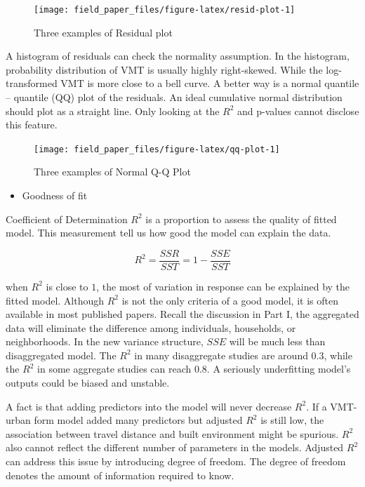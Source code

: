 \documentclass[
  11pt,
  openany]{memoir}
\providecommand{\tightlist}{%
  \setlength{\itemsep}{0pt}\setlength{\parskip}{0pt}}
\begin{document}
\begin{figure}

{\centering \texttt{[image: field\_paper\_files/figure-latex/resid-plot-1]} 

}

\caption{Three examples of Residual plot}\label{fig:resid-plot}
\end{figure}

A histogram of residuals can check the normality assumption. In the histogram, probability distribution of VMT is usually highly right-skewed. While the log-transformed VMT is more close to a bell curve.
A better way is a normal quantile -- quantile (QQ) plot of the residuals.
An ideal cumulative normal distribution should plot as a straight line.
Only looking at the \(R^2\) and p-values cannot disclose this feature.

\begin{figure}

{\centering \texttt{[image: field\_paper\_files/figure-latex/qq-plot-1]} 

}

\caption{Three examples of Normal Q-Q Plot}\label{fig:qq-plot}
\end{figure}

\begin{itemize}
\tightlist
\item
  Goodness of fit
\end{itemize}

Coefficient of Determination \(R^2\) is a proportion to assess the quality of fitted model. This measurement tell us how good the model can explain the data.

\begin{equation}
R^2 =\frac{SSR}{SST}=1-\frac{SSE}{SST}
\label{eq:rsq}
\end{equation}

when \(R^2\) is close to \(1\), the most of variation in response can be explained by the fitted model. Although \(R^2\) is not the only criteria of a good model, it is often available in most published papers. Recall the discussion in Part I, the aggregated data will eliminate the difference among individuals, households, or neighborhoods. In the new variance structure, \(SSE\) will be much less than disaggregated model. The \(R^2\) in many disaggregate studies are around 0.3, while the \(R^2\) in some aggregate studies can reach 0.8. A seriously underfitting model's outputs could be biased and unstable.

A fact is that adding predictors into the model will never decrease \(R^2\).
If a VMT-urban form model added many predictors but adjusted \(R^2\) is still low, the association between travel distance and built environment might be spurious.
\(R^2\) also cannot reflect the different number of parameters in the models. Adjusted \(R^2\) can address this issue by introducing degree of freedom. The degree of freedom denotes the amount of information required to know.
\end{document}
